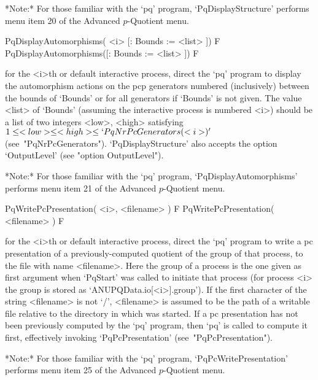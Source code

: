 \endlist

*Note:*
For those familiar with the `pq'  program,  `PqDisplayStructure'  performs
menu item 20 of the Advanced $p$-Quotient menu.

\>PqDisplayAutomorphisms( <i> [: Bounds := <list> ]) F
\>PqDisplayAutomorphisms([: Bounds := <list> ]) F

for the <i>th or default interactive {\ANUPQ} process,  direct  the  `pq'
program to display the automorphism actions on the pcp generators numbered
(inclusively) between the bounds of `Bounds' or  for  all  generators  if
`Bounds' is not  given.  The  value  <list>  of  `Bounds'  (assuming  the
interactive process is numbered <i>) should be a  list  of  two  integers
<low>,   <high>   satisfying   $1    \le    <low>    \le    <high>    \le
`PqNrPcGenerators(<i>)'$  (see~"PqNrPcGenerators").  `PqDisplayStructure'
also accepts the option `OutputLevel' (see "option OutputLevel").

*Note:*
For  those  familiar  with  the  `pq'  program,   `PqDisplayAutomorphisms'
performs menu item 21 of the Advanced $p$-Quotient menu.

\>PqWritePcPresentation( <i>, <filename> ) F
\>PqWritePcPresentation( <filename> ) F

for the <i>th or default interactive {\ANUPQ} process,  direct  the  `pq'
program to write a pc presentation of a previously-computed  quotient  of
the group of that process, to the file with  name  <filename>.  Here  the
group of a process is the one given as first argument when `PqStart'  was
called to initiate that process (for process <i> the group is  stored  as
`ANUPQData.io[<i>].group').  If  the  first  character  of   the   string
<filename> is not `/', <filename> is assumed to be the path of a writable
file relative to the directory in which  {\GAP}  was  started.  If  a  pc
presentation has not been previously computed by the `pq'  program,  then
`pq'   is   called   to   compute   it   first,   effectively    invoking
`PqPcPresentation' (see~"PqPcPresentation").

*Note:* For those familiar with the `pq' program, `PqPcWritePresentation'
performs menu item 25 of the Advanced $p$-Quotient menu.

%
%
%
%

